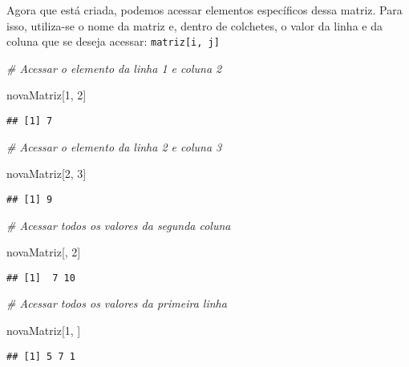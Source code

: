 \documentclass[
]{article}
\newenvironment{Shaded}{\begin{snugshade}}{\end{snugshade}}
\newcommand{\CommentTok}[1]{\textcolor[rgb]{0.56,0.35,0.01}{\textit{#1}}}
\newcommand{\DecValTok}[1]{\textcolor[rgb]{0.00,0.00,0.81}{#1}}
\newcommand{\NormalTok}[1]{#1}
\begin{document}
Agora que está criada, podemos acessar elementos específicos dessa
matriz. Para isso, utiliza-se o nome da matriz e, dentro de colchetes, o
valor da linha e da coluna que se deseja acessar:
\texttt{matriz{[}i,\ j{]}}

\begin{Shaded}
\begin{Highlighting}[]
\CommentTok{# Acessar o elemento da linha 1 e coluna 2}

\NormalTok{novaMatriz[}\DecValTok{1}\NormalTok{, }\DecValTok{2}\NormalTok{]}
\end{Highlighting}
\end{Shaded}

\begin{verbatim}
## [1] 7
\end{verbatim}

\begin{Shaded}
\begin{Highlighting}[]
\CommentTok{# Acessar o elemento da linha 2 e coluna 3}

\NormalTok{novaMatriz[}\DecValTok{2}\NormalTok{, }\DecValTok{3}\NormalTok{]}
\end{Highlighting}
\end{Shaded}

\begin{verbatim}
## [1] 9
\end{verbatim}

\begin{Shaded}
\begin{Highlighting}[]
\CommentTok{# Acessar todos os valores da segunda coluna}

\NormalTok{novaMatriz[, }\DecValTok{2}\NormalTok{]}
\end{Highlighting}
\end{Shaded}

\begin{verbatim}
## [1]  7 10
\end{verbatim}

\begin{Shaded}
\begin{Highlighting}[]
\CommentTok{# Acessar todos os valores da primeira linha}

\NormalTok{novaMatriz[}\DecValTok{1}\NormalTok{, ]}
\end{Highlighting}
\end{Shaded}

\begin{verbatim}
## [1] 5 7 1
\end{verbatim}
\end{document}
